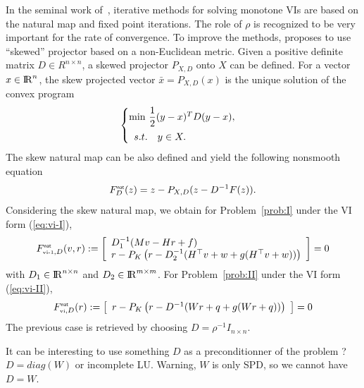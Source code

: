 In the seminal work of~\cite{Sibony1970}, iterative methods for solving monotone VIs are based on the natural map and fixed point iterations. The role of $\rho$ is recognized to be very important for the rate of convergence. To improve the methods, \citet{Sibony1970} proposes to use ``skewed'' projector based on a non-Euclidean metric. Given a positive definite matrix $D\in R^{n\times n}$, a skewed projector $P_{X,D}$ onto $X$ can be defined. For a vector $x\in \mathrm{I\!R}^n$, the skew projected vector $\bar x  = P_{X,D}(x)$ is the unique solution of the convex program
\begin{equation}
  \label{eq:opt-proj-skew}
  \begin{cases}
    \min\, \Frac 1 2 (y-x)^T D (y-x), \\[2mm]
    \begin{array}{ll}
    s.t. & y \in X .
  \end{array}
  \end{cases}
\end{equation} 
The skew natural map can be also defined and yield the following nonsmooth equation
\begin{equation}
  \label{eq:skew-natural-NE}
   F_D^\nat(z) = z - P_{X,D}(z-D^{-1} F(z)).
\end{equation}
Considering the skew natural map, we obtain for Problem~\ref{prob:I} under the VI form (\ref{eq:vi-I}),
\begin{equation}
  \label{eq:natural-typeI}
  F_{\vione,D}^\nat(v,r) := \left[
  \begin{array}{l}
    D_1^{-1} (Mv - Hr + f) \\ 
    r - P_{K}\left(r  - D_2^{-1} (H^\top v + w  + g(H^\top v + w))\right)
  \end{array}\right] = 0
\end{equation}
with $D_1\in \mathrm{I\!R}^{n\times n}$ and $D_2\in \mathrm{I\!R}^{m\times m}$.
For Problem~\ref{prob:II} under the VI form (\ref{eq:vi-II}),
\begin{equation}
  \label{eq:natural-typeII}
  F_{\vitwo,D}^\nat(r) := \left[
  \begin{array}{l} 
    r - P_{K}\left(r  - D^{-1} ( W r +q   + g(Wr+q))\right)  \end{array}\right] = 0
\end{equation}
The previous case is retrieved by choosing $D = \rho^{-1} I_{n\times n}$. 





\begin{ndrva}
  It can be interesting to use something $D$ as a preconditionner of the problem ? $D=diag(W)$ or incomplete LU. Warning, $W$ is only SPD, so we cannot have $D =W$.
\end{ndrva}

